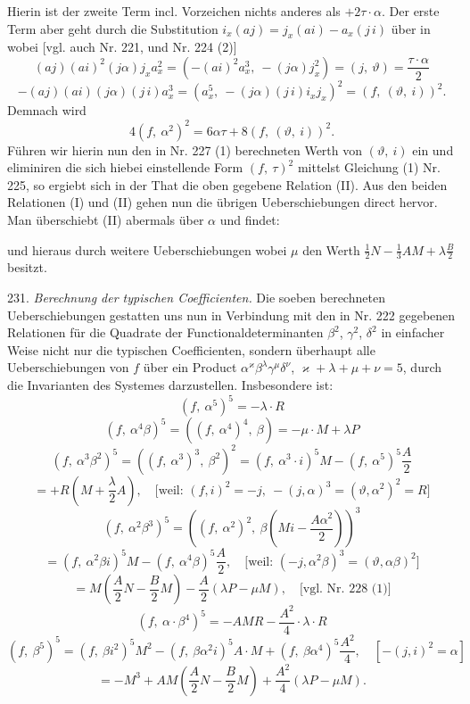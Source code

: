 Hierin ist der zweite Term incl. Vorzeichen nichts anderes als $+2\tau \cdot \alpha$.
Der erste Term aber geht durch die Substitution $i_x(aj) = j_x(ai) - a_x(j\,i)$
über in
wobei [vgl. auch Nr. 221, und Nr. 224 (2)]
\[
(aj)(ai)^2(j\alpha)j_x a_x^2 = \left(-(ai)^2 a_x^3,\ -(j\alpha)j_x^2\right) = (j,\ \vartheta) = \frac{\tau \cdot \alpha}{2}
\]
\[
-(aj)(ai)(j\alpha)(j\,i)a_x^3 = \left(a_x^5,\ -(j\alpha)(j\,i)i_x j_x\right)^2 = (f,\ (\vartheta,\ i))^2.
\]
Demnach wird
\[
4(f,\ \alpha^2)^2 = 6\alpha\tau + 8(f,\ (\vartheta,\ i))^2.
\]
Führen wir hierin nun den in Nr. 227 (1) berechneten Werth von
$(\vartheta,\ i)$ ein und eliminiren die sich hiebei einstellende Form $(f,\ \tau)^2$ mittelst
Gleichung (1) Nr. 225, so ergiebt sich in der That die oben gegebene
Relation (II). Aus den beiden Relationen (I) und (II) gehen
nun die übrigen Ueberschiebungen direct hervor. Man überschiebt (II)
abermals über $\alpha$ und findet:



und hieraus durch weitere Ueberschiebungen
wobei $\mu$ den Werth $\frac{1}{2}N - \frac{1}{3}AM + \lambda\frac{B}{2}$ besitzt.

231. \textit{Berechnung der typischen Coefficienten.} Die soeben berechneten
Ueberschiebungen gestatten uns nun in Verbindung mit den in
Nr. 222 gegebenen Relationen für die Quadrate der Functionaldeterminanten
$\beta^2$, $\gamma^2$, $\delta^2$ in einfacher Weise nicht nur die typischen Coefficienten,
sondern überhaupt alle Ueberschiebungen von $f$ über ein Product
$\alpha^{\varkappa}\beta^{\lambda}\gamma^{\mu}\delta^{\nu}$, $\varkappa + \lambda + \mu + \nu = 5$, durch die Invarianten des
Systemes darzustellen. Insbesondere ist:
\[
(f,\ \alpha^5)^5 = -\lambda \cdot R
\]
\[
(f,\ \alpha^4\beta)^5 = \left((f,\ \alpha^4)^4,\ \beta\right) = -\mu \cdot M + \lambda P
\]
\[
(f,\ \alpha^3\beta^2)^5 = \left((f,\ \alpha^3)^3,\ \beta^2\right)^2 = (f,\ \alpha^3 \cdot i)^5 M - (f,\ \alpha^5)^5 \frac{A}{2}
\]
\[
{} = +R\left(M + \frac{\lambda}{2}A\right), \quad \text{[weil: } (f,i)^2 = -j,\ -(j,\alpha)^3 = (\vartheta,\alpha^2)^2 = R\text{]}
\]
\[
(f,\ \alpha^2\beta^3)^5 = \left((f,\ \alpha^2)^2,\ \beta\left(Mi - \frac{A\alpha^2}{2}\right)\right)^3
\]
\[
{} = (f,\ \alpha^2\beta i)^5 M - (f,\ \alpha^4\beta)^5 \frac{A}{2}, \quad \text{[weil: } (-j,\alpha^2\beta)^3 = (\vartheta,\alpha\beta)^2\text{]}
\]
\[
{} = M\left(\frac{A}{2}N - \frac{B}{2}M\right) - \frac{A}{2}(\lambda P - \mu M), \quad \text{[vgl. Nr. 228 (1)]}
\]
\[
(f,\ \alpha \cdot \beta^4)^5 = -AMR - \frac{A^2}{4} \cdot \lambda \cdot R
\]
\[
(f,\ \beta^5)^5 = (f,\ \beta i^2)^5 M^2 - (f,\ \beta\alpha^2 i)^5 A \cdot M + (f,\ \beta\alpha^4)^5 \frac{A^2}{4}, \quad [-(j,i)^2 = \alpha]
\]
\[
{} = -M^3 + AM\left(\frac{A}{2}N - \frac{B}{2}M\right) + \frac{A^2}{4}(\lambda P - \mu M).
\]


